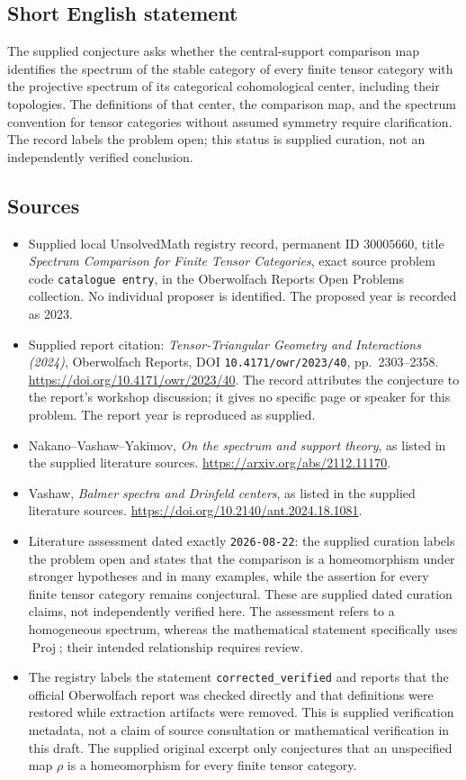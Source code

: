 \documentclass[11pt]{article}
\begin{document}
\subsection{Short English statement}
The supplied conjecture asks whether the central-support comparison map identifies the spectrum of the stable category of every finite tensor category with the projective spectrum of its categorical cohomological center, including their topologies. The definitions of that center, the comparison map, and the spectrum convention for tensor categories without assumed symmetry require clarification. The record labels the problem open; this status is supplied curation, not an independently verified conclusion.
\subsection{Sources}
\begin{itemize}
\item Supplied local UnsolvedMath registry record, permanent ID \(30005660\), title \emph{Spectrum Comparison for Finite Tensor Categories}, exact source problem code \texttt{catalogue entry}, in the Oberwolfach Reports Open Problems collection. No individual proposer is identified. The proposed year is recorded as 2023.
\item Supplied report citation: \emph{Tensor-Triangular Geometry and Interactions (2024)}, Oberwolfach Reports, DOI \texttt{10.4171/owr/2023/40}, pp.\ 2303--2358. \url{https://doi.org/10.4171/owr/2023/40}. The record attributes the conjecture to the report's workshop discussion; it gives no specific page or speaker for this problem. The report year is reproduced as supplied.
\item Nakano--Vashaw--Yakimov, \emph{On the spectrum and support theory}, as listed in the supplied literature sources. \url{https://arxiv.org/abs/2112.11170}.
\item Vashaw, \emph{Balmer spectra and Drinfeld centers}, as listed in the supplied literature sources. \url{https://doi.org/10.2140/ant.2024.18.1081}.
\item Literature assessment dated exactly \texttt{2026-08-22}: the supplied curation labels the problem open and states that the comparison is a homeomorphism under stronger hypotheses and in many examples, while the assertion for every finite tensor category remains conjectural. These are supplied dated curation claims, not independently verified here. The assessment refers to a homogeneous spectrum, whereas the mathematical statement specifically uses \(\operatorname{Proj}\); their intended relationship requires review.
\item The registry labels the statement \texttt{corrected\_verified} and reports that the official Oberwolfach report was checked directly and that definitions were restored while extraction artifacts were removed. This is supplied verification metadata, not a claim of source consultation or mathematical verification in this draft. The supplied original excerpt only conjectures that an unspecified map \(\rho\) is a homeomorphism for every finite tensor category.
\end{itemize}
\end{document}
